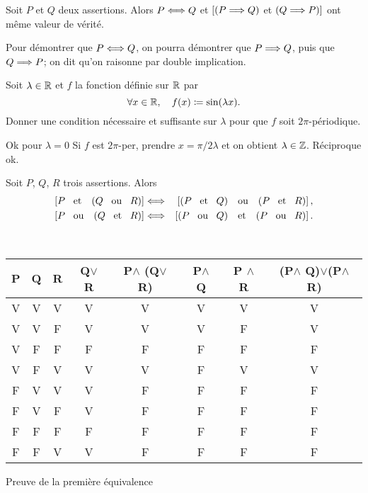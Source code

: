 \documentclass{magnolia}
\begin{document}
\begin{proposition}[utile=-3]
Soit $P$ et $Q$ deux assertions. Alors $P\Longleftrightarrow Q$ et $[\left(P\Longrightarrow Q\right)$ et
$\left(Q \Longrightarrow P\right)]$ ont même valeur de vérité.
\end{proposition}

\begin{remarqueUnique}
\remarque Pour démontrer que $P\Longleftrightarrow Q$, on pourra démontrer que
  $P\Longrightarrow Q$, puis que $Q\Longrightarrow P$; on dit qu'on raisonne par
  double implication.
\end{remarqueUnique}

\begin{exoUnique}
\exo Soit $\lambda\in\mathbb{R}$ et $f$ la fonction définie sur $\mathbb{R}$ par
  \[\forall x\in\mathbb{R} ,\quad f(x)\coloneqq \sin(\lambda x).\]
  Donner une condition nécessaire et suffisante sur $\lambda$ pour que
  $f$ soit $2\pi$-périodique.
\end{exoUnique}

\begin{sol}
Ok pour $\lambda=0$
Si $f$ est $2\pi$-per, prendre $x=\pi/2\lambda$ et on obtient $\lambda\in\mathbb{Z}$. Réciproque ok.
\end{sol}

\begin{proposition}[utile=-3]
Soit $P$, $Q$, $R$ trois assertions. Alors
\begin{eqnarray*}
\cro{P \et \p{Q \ou R}} &\ssi& \cro{\p{P \et Q} \ou \p{P \et R}},\\
\cro{P \ou \p{Q \et R}} &\ssi& \cro{\p{P \ou Q} \et \p{P \ou R}}.
\end{eqnarray*}
\end{proposition}

\begin{preuve}

~~
\begin{center}
  \begin{tabular}{|c|c|c|c|c|c|c|c|}
  \hline
  P & Q & R & Q$\lor$ R & P$\wedge$ (Q$\lor$ R) & P$\wedge$ Q & P $\wedge$ R & (P$\wedge$ Q)$\lor$(P$\wedge$ R) \\
  \hline
  V &V & V &V &V &V &V &V \\
  \hline
  V & V & F & V &V &V &F & V \\
  \hline
  V& F & F & F &F &F &F & F \\
  \hline
  V & F & V & V &V &F &V & V \\
  \hline
  F & V & V & V &F &F &F & F \\
  \hline
  F & V & F & V &F &F &F & F \\
  \hline
  F &F &F & F &F &F &F & F \\
  \hline
  F &F &V & V &F &F &F & F \\
  \hline
  \end{tabular}
  Preuve de la première équivalence
  
\end{center}
\end{preuve}
\end{document}
